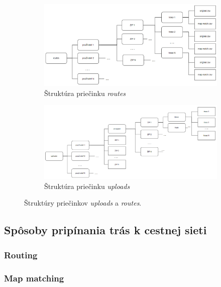 \begin{figure}[H]
    \centering
    \begin{subfigure}{\textwidth}
      \centering
      \includegraphics[width=1\textwidth]{img/struktura priecinkov/routes.png}
      \caption{Štruktúra priečinku \textit{routes}}
      \label{fig:routes-structure}
    \end{subfigure}
    \begin{subfigure}{\textwidth}
      \centering
      \includegraphics[width=1\textwidth]{img/struktura priecinkov/uploads.png}
      \caption{Štruktúra priečinku \textit{uploads}}
      \label{fig:uploads-structure}
    \end{subfigure}
    \caption{Štruktúry priečinkov \textit{uploads} a \textit{routes}.}
    \label{fig:uploads-routes-structure}
  \end{figure}


\subsection{Spôsoby pripínania trás k cestnej sieti}
\subsubsection{Routing}
\subsubsection{Map matching}
